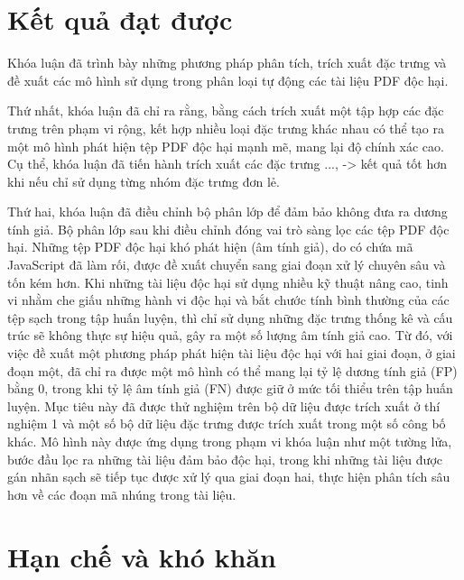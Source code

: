 \documentclass[./../main.tex]{subfiles}
\begin{document}
\section{Kết quả đạt được}
Khóa luận đã trình bày những phương pháp phân tích, trích xuất đặc trưng và đề xuất các mô hình sử dụng trong phân loại tự động các tài liệu PDF độc hại.

Thứ nhất, khóa luận đã chỉ ra rằng, bằng cách trích xuất một tập hợp các đặc trưng trên phạm vi rộng, kết hợp nhiều loại đặc trưng khác nhau có thể tạo ra một mô hình phát hiện tệp PDF độc hại mạnh mẽ, mang lại độ chính xác cao.
Cụ thể, khóa luận đã tiến hành trích xuất các đặc trưng ..., -> kết quả tốt hơn khi nếu chỉ sử dụng từng nhóm đặc trưng đơn lẻ.

Thứ hai, khóa luận đã điều chỉnh bộ phân lớp để đảm bảo không đưa ra dương tính giả. Bộ phân lớp sau khi điều chỉnh đóng vai trò sàng lọc các tệp PDF độc hại. Những tệp PDF độc hại khó phát hiện (âm tính giả), do có chứa mã JavaScript đã làm rối, được đề xuất chuyển sang giai đoạn xử lý chuyên sâu và tốn kém hơn.
Khi những tài liệu độc hại sử dụng nhiều kỹ thuật nâng cao, tinh vi nhằm che giấu những hành vi độc hại và bắt chước tính bình thường của các tệp sạch trong tập huấn luyện, thì chỉ sử dụng những đặc trưng thống kê và cấu trúc sẽ không thực sự hiệu quả, gây ra một số lượng âm tính giả cao. Từ đó, với việc đề xuất một phương pháp phát hiện tài liệu độc hại với hai giai đoạn, ở giai đoạn một, đã chỉ ra được một mô hình có thể mang lại tỷ lệ dương tính giả (FP) bằng 0, trong khi tỷ lệ âm tính giả (FN) được giữ ở mức tối thiểu trên tập huấn luyện. Mục tiêu này đã được thử nghiệm trên bộ dữ liệu được trích xuất ở thí nghiệm 1 và một số bộ dữ liệu đặc trưng được trích xuất trong một số công bố khác. Mô hình này được ứng dụng trong phạm vi khóa luận như một tường lửa, bước đầu lọc ra những tài liệu đảm bảo độc hại, trong khi những tài liệu được gán nhãn sạch sẽ tiếp tục được xử lý qua giai đoạn hai, thực hiện phân tích sâu hơn về các đoạn mã nhúng trong tài liệu.


\section{Hạn chế và khó khăn}
\end{document}
